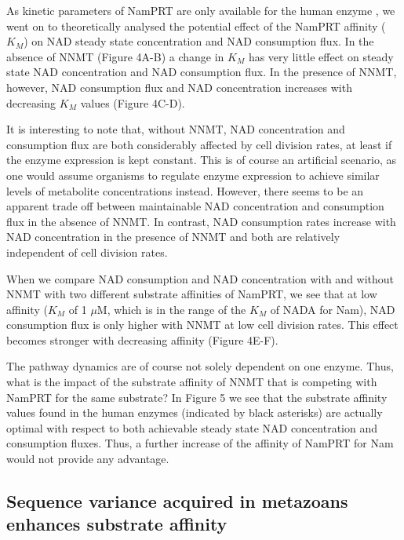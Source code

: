 As kinetic parameters of NamPRT are only available for the human enzyme \cite{Burgos2008}, we went on to theoretically analysed the potential effect of the NamPRT affinity ($K_M$) on NAD steady state concentration and NAD consumption flux. In the absence of NNMT (Figure 4A-B) a change in $K_M$ has very little effect on steady state NAD concentration and NAD consumption flux.  In the presence of NNMT, however, NAD consumption flux and NAD concentration increases with decreasing $K_M$ values (Figure 4C-D).

It is interesting to note that, without NNMT, NAD concentration and consumption flux are both considerably affected by cell division rates, at least if the enzyme expression is kept constant. This is of course an artificial scenario, as one would assume organisms to regulate enzyme expression to achieve similar levels of metabolite concentrations instead. However, there seems to be an apparent trade off between maintainable NAD concentration and consumption flux in the absence of NNMT. In contrast,  NAD consumption rates increase with NAD concentration in the presence of NNMT and both are relatively independent of cell division rates.

When we compare NAD consumption and NAD concentration with and without NNMT with two different substrate affinities of NamPRT, we see that at low affinity ($K_M$ of 1 $\mu$M, which is in the range of the $K_M$  of NADA for Nam), NAD consumption flux is only higher with NNMT at low cell division rates. This effect becomes stronger with decreasing affinity (Figure 4E-F).


The pathway dynamics are of course not solely dependent on one enzyme. Thus, what is the impact of the substrate affinity of NNMT that is competing with NamPRT for the same substrate? In Figure 5 we see that the substrate affinity values found in the human enzymes (indicated by black asterisks) are actually optimal with respect to both achievable steady state NAD concentration and consumption fluxes. Thus, a further increase of the affinity of NamPRT for Nam would not provide any advantage.


\subsection{Sequence variance acquired in metazoans enhances substrate affinity}

